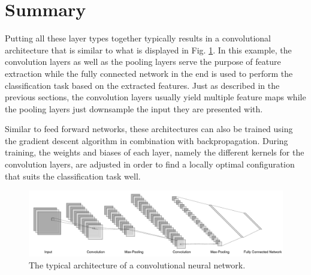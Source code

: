 \section{Summary}

Putting all these layer types together typically results in a
convolutional architecture that is similar to what is displayed in
Fig. \ref{fig:convnet}. In this example, the convolution layers as
well as the pooling layers serve the purpose of feature extraction
while the fully connected network in the end is used to perform the
classification task based on the extracted features. Just as described
in the previous sections, the convolution layers usually yield
multiple feature maps while the pooling layers just downsample the
input they are presented with.

Similar to feed forward networks, these architectures can also be
trained using the gradient descent algorithm in combination with
backpropagation. During training, the weights and biases of each
layer, namely the different kernels for the convolution layers, are
adjusted in order to find a locally optimal configuration that suits
the classification task well.
\begin{figure}[h]
  \centering
  \includegraphics[width=\textwidth]{../figures/convnet}
  \caption{The typical architecture of a convolutional neural
    network.}
  \label{fig:convnet}
\end{figure}
